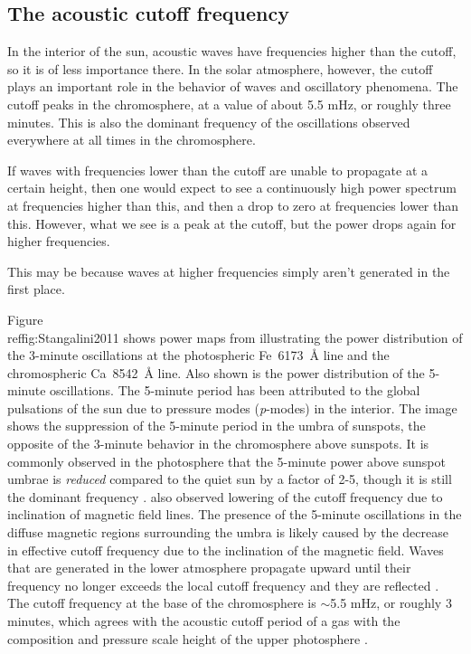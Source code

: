 \newpage
\subsection{The acoustic cutoff frequency}
In the interior of the sun, acoustic waves have frequencies higher than the
cutoff, so it is of less importance there. In the solar atmosphere, however,
the cutoff plays an important role in the behavior of waves and oscillatory
phenomena.
The cutoff peaks in the chromosphere, at a value of about 5.5 mHz,
or roughly three minutes. This is also the dominant frequency of the
oscillations observed everywhere at all times in the chromosphere.

If waves with frequencies lower than the cutoff are unable to propagate
at a certain height, then one would expect to see a continuously high power
spectrum at frequencies higher than this, and then a drop to zero at
frequencies lower than this. However, what we see is a peak at the cutoff,
but the power drops again for higher frequencies.


This may be because waves at higher frequencies simply aren't generated
in the first place.



Figure~\\ref{fig:Stangalini2011} shows power maps from
\cite{Stangalini2011} illustrating the power distribution of the
3-minute oscillations at the photospheric Fe~6173~\AA{} line and the
chromospheric Ca~8542~\AA{} line. Also shown is the power distribution
of the 5-minute oscillations. The 5-minute period has been attributed
to the global pulsations of the sun due to pressure modes
(\textit{p}-modes) in the interior. The image shows the suppression of
the 5-minute period in the umbra of sunspots, the opposite of the
3-minute behavior in the chromosphere above sunspots. It is commonly
observed in the photosphere that the 5-minute power above sunspot
umbrae is \emph{reduced} compared to the quiet sun by a factor of 2-5,
though it is still the dominant frequency
\citep{Felipe2010, Bogdan2006}.
\cite{Reznikova2012} also observed lowering of the cutoff frequency
due to inclination of magnetic field lines.
The presence of the 5-minute oscillations in the diffuse magnetic regions
surrounding the umbra is likely caused by the decrease in effective
cutoff frequency due to the inclination of the magnetic field. Waves
that are generated in the lower atmosphere propagate upward until
their frequency no longer exceeds the local cutoff frequency and they
are reflected \citep{DeMoortel2000, Brynildsen1999}. The cutoff
frequency at the base of the chromosphere is $\sim$5.5 mHz, or roughly
3 minutes, which agrees with the acoustic cutoff period of a gas with
the composition and pressure scale height of the upper photosphere
\citep{Kalkofen1994}.

